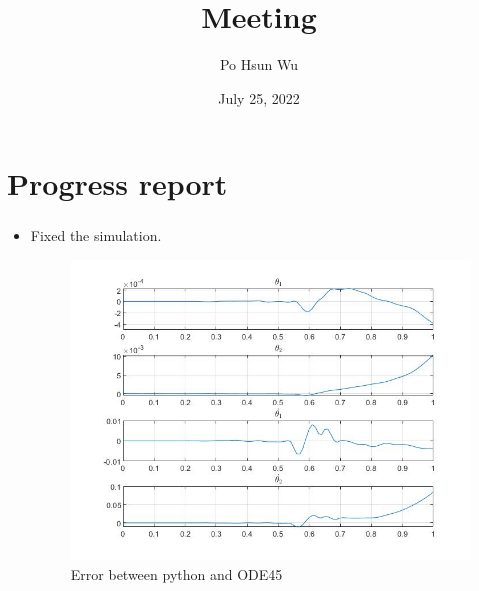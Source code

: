 \documentclass{beamer}
\date{July 25, 2022}
\title{Meeting}
\author{Po Hsun Wu}
\begin{document}
    \maketitle

    \section{Progress report}
    \begin{frame}
        \frametitle{\secname}

        \begin{itemize}
            \item Fixed the simulation.
            \begin{figure}
                \centering
                \includegraphics[scale=.3]{Figs/error.jpg}
                \caption{Error between python and ODE45}

            \end{figure}
        \end{itemize}
    \end{frame}
\end{document}
